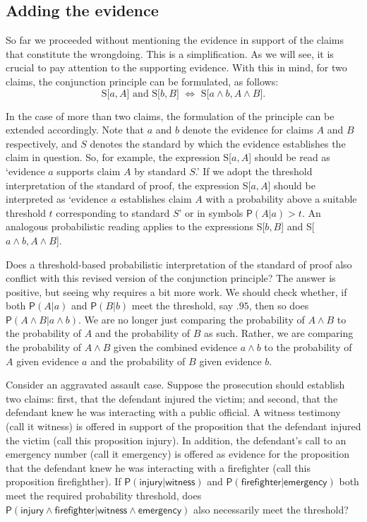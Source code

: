\documentclass[
  10pt,
  dvipsnames,enabledeprecatedfontcommands]{scrartcl}
\newcommand{\pr}[1]{\ensuremath{\mathsf{P}(#1)}}
\begin{document}
\hypertarget{adding-the-evidence}{%
\subsection{Adding the evidence}\label{adding-the-evidence}}

So far we proceeded without mentioning the evidence in support of the
claims that constitute the wrongdoing. This is a simplification. As we
will see, it is crucial to pay attention to the supporting evidence.
With this in mind, for two claims, the conjunction principle can be
formulated, as follows:
\[\text{S[$a, A$] and S[$b, B$] $\Leftrightarrow$ S[$a \wedge b, A\wedge B$]}.\]

\noindent In the case of more than two claims, the formulation of the
principle can be extended accordingly. Note that \(a\) and \(b\) denote
the evidence for claims \(A\) and \(B\) respectively, and \(S\) denotes
the standard by which the evidence establishes the claim in question.
So, for example, the expression S{[}\(a, A\){]} should be read as
`evidence \(a\) supports claim \(A\) by standard \(S\).' If we adopt the
threshold interpretation of the standard of proof, the expression
S{[}\(a, A\){]} should be interpreted as `evidence \(a\) establishes
claim \(A\) with a probability above a suitable threshold \(t\)
corresponding to standard \(S\)' or in symbols \(\pr{A \vert a}>t\). An
analogous probabilistic reading applies to the expressions
S{[}\(b, B\){]} and S{[}\(a \wedge b, A\wedge B\){]}.

Does a threshold-based probabilistic interpretation of the standard of
proof also conflict with this revised version of the conjunction
principle? The answer is positive, but seeing why requires a bit more
work. We should check whether, if both \(\pr{A \vert a}\) and
\(\pr{B \vert b}\) meet the threshold, say \(.95\), then so does
\(\pr{A\wedge B \vert a\wedge b}\). We are no longer just comparing the
probability of \(A\wedge B\) to the probability of \(A\) and the
probability of \(B\) as such. Rather, we are comparing the probability
of \(A \wedge B\) given the combined evidence \(a \wedge b\) to the
probability of \(A\) given evidence \(a\) and the probability of \(B\)
given evidence \(b\).

Consider an aggravated assault case. Suppose the prosecution should
establish two claims: first, that the defendant injured the victim; and
second, that the defendant knew he was interacting with a public
official. A witness testimony (call it \textsf{witness}) is offered in
support of the proposition that the defendant injured the victim (call
this proposition \textsf{injury}). In addition, the defendant's call to
an emergency number (call it \textsf{emergency}) is offered as evidence
for the proposition that the defendant knew he was interacting with a
firefighter (call this proposition \textsf{firefighther}). If
\(\pr{\textsf{injury} \vert \textsf{witness}}\) and
\(\pr{\textsf{firefighter} \vert \textsf{emergency} }\) both meet the
required probability threshold, does
\(\pr{\textsf{injury} \wedge \textsf{firefighter} \vert \textsf{witness} \wedge \textsf{emergency}}\)
also necessarily meet the threshold?
\end{document}
